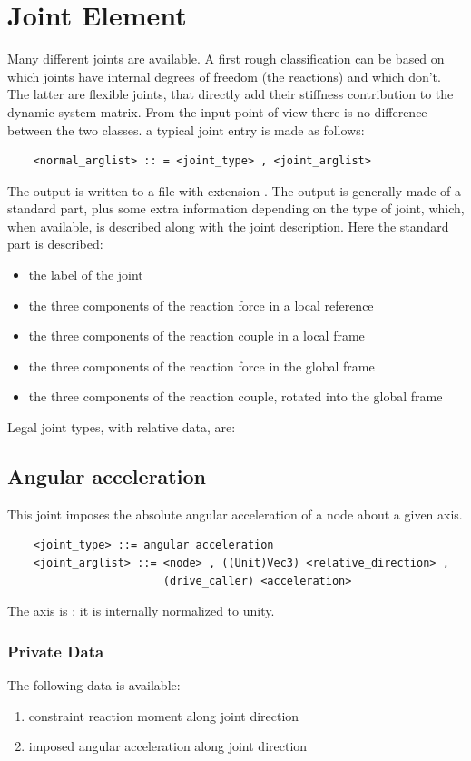 \section{Joint Element}
Many different joints are available. A first rough classification can be
based on which joints have internal degrees of freedom (the reactions) and
which don't. The latter are flexible joints, that directly add their
stiffness contribution to the dynamic system matrix. From the input point
of view there is no difference between the two classes.
a typical joint entry is made as follows:
\begin{verbatim}
    <normal_arglist> :: = <joint_type> , <joint_arglist>
\end{verbatim}
The output is written to a file with extension .
The output is generally made of a standard part, plus some extra information
depending on the type of joint, which, when available, is described along
with the joint description.
Here the standard part is described:
\begin{itemize}
    \item the label of the joint
    \item the three components of the reaction force in a local reference
    \item the three components of the reaction couple in a local frame
    \item the three components of the reaction force in the global frame
    \item the three components of the reaction couple, rotated into the
          global frame
\end{itemize}
Legal joint types, with relative data, are:




\subsection{Angular acceleration}
This joint imposes the absolute angular acceleration of a node
about a given axis.
\begin{verbatim}
    <joint_type> ::= angular acceleration
    <joint_arglist> ::= <node> , ((Unit)Vec3) <relative_direction> , 
                        (drive_caller) <acceleration>
\end{verbatim}
The axis is ; it is internally normalized to unity.

\subsubsection{Private Data}
The following data is available:
\begin{enumerate}
\item {} constraint reaction moment along joint direction
\item {} imposed angular acceleration along joint direction
\end{enumerate}




